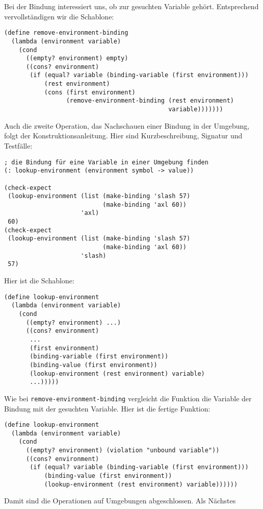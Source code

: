 %
Bei der Bindung interessiert uns, ob zur gesuchten Variable gehört.
Entsprechend vervollständigen wir die Schablone:
%
\begin{lstlisting}
(define remove-environment-binding
  (lambda (environment variable)
    (cond
      ((empty? environment) empty)
      ((cons? environment)
       (if (equal? variable (binding-variable (first environment)))
           (rest environment)
           (cons (first environment)
                 (remove-environment-binding (rest environment)
                                             variable)))))))
\end{lstlisting} 
%
Auch die zweite Operation, das Nachschauen einer Bindung in der
Umgebung, folgt der Konstruktionsanleitung.  Hier sind
Kurzbeschreibung, Signatur und Testfälle:
%
\begin{lstlisting}
; die Bindung für eine Variable in einer Umgebung finden
(: lookup-environment (environment symbol -> value))

(check-expect
 (lookup-environment (list (make-binding 'slash 57)
                           (make-binding 'axl 60)) 
                     'axl)
 60)
(check-expect
 (lookup-environment (list (make-binding 'slash 57)
                           (make-binding 'axl 60))
                     'slash)
 57)
\end{lstlisting}
%
Hier ist die Schablone:
%
\begin{lstlisting}
(define lookup-environment
  (lambda (environment variable)
    (cond
      ((empty? environment) ...)
      ((cons? environment)
       ...
       (first environment)
       (binding-variable (first environment))
       (binding-value (first environment))
       (lookup-environment (rest environment) variable)
       ...)))))
\end{lstlisting}
%
Wie bei \lstinline{remove-environment-binding} vergleicht die Funktion
die Variable der Bindung mit der gesuchten Variable.  Hier ist die
fertige Funktion:
%
\begin{lstlisting}
(define lookup-environment
  (lambda (environment variable)
    (cond
      ((empty? environment) (violation "unbound variable"))
      ((cons? environment)
       (if (equal? variable (binding-variable (first environment)))
           (binding-value (first environment))
           (lookup-environment (rest environment) variable))))))
\end{lstlisting}
%
%
Damit sind die Operationen auf Umgebungen abgeschlossen.  Als Nächstes
